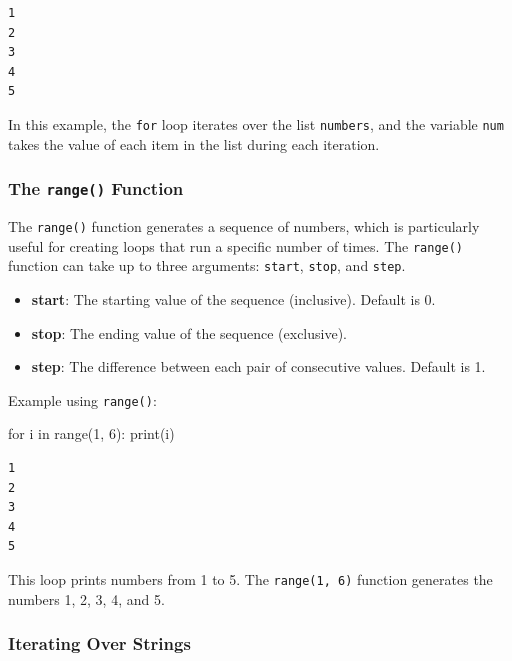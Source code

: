 \documentclass[
  letterpaper,
  DIV=11,
  numbers=noendperiod]{scrreprt}
\newenvironment{Shaded}{\begin{snugshade}}{\end{snugshade}}
\newcommand{\BuiltInTok}[1]{\textcolor[rgb]{0.00,0.23,0.31}{#1}}
\newcommand{\ControlFlowTok}[1]{\textcolor[rgb]{0.00,0.23,0.31}{#1}}
\newcommand{\DecValTok}[1]{\textcolor[rgb]{0.68,0.00,0.00}{#1}}
\newcommand{\KeywordTok}[1]{\textcolor[rgb]{0.00,0.23,0.31}{#1}}
\newcommand{\NormalTok}[1]{\textcolor[rgb]{0.00,0.23,0.31}{#1}}
\providecommand{\tightlist}{%
  \setlength{\itemsep}{0pt}\setlength{\parskip}{0pt}}\usepackage{longtable,booktabs,array}
\begin{document}
\begin{verbatim}
1
2
3
4
5
\end{verbatim}

In this example, the \texttt{for} loop iterates over the list
\texttt{numbers}, and the variable \texttt{num} takes the value of each
item in the list during each iteration.

\hypertarget{the-range-function}{%
\subsubsection{\texorpdfstring{The \texttt{range()}
Function}{The range() Function}}\label{the-range-function}}

The \texttt{range()} function generates a sequence of numbers, which is
particularly useful for creating loops that run a specific number of
times. The \texttt{range()} function can take up to three arguments:
\texttt{start}, \texttt{stop}, and \texttt{step}.

\begin{itemize}
\tightlist
\item
  \textbf{start}: The starting value of the sequence (inclusive).
  Default is 0.
\item
  \textbf{stop}: The ending value of the sequence (exclusive).
\item
  \textbf{step}: The difference between each pair of consecutive values.
  Default is 1.
\end{itemize}

Example using \texttt{range()}:

\begin{Shaded}
\begin{Highlighting}[]
\ControlFlowTok{for}\NormalTok{ i }\KeywordTok{in} \BuiltInTok{range}\NormalTok{(}\DecValTok{1}\NormalTok{, }\DecValTok{6}\NormalTok{):}
    \BuiltInTok{print}\NormalTok{(i)}
\end{Highlighting}
\end{Shaded}

\begin{verbatim}
1
2
3
4
5
\end{verbatim}

This loop prints numbers from 1 to 5. The \texttt{range(1,\ 6)} function
generates the numbers 1, 2, 3, 4, and 5.

\hypertarget{iterating-over-strings}{%
\subsubsection{Iterating Over Strings}\label{iterating-over-strings}}
\end{document}
